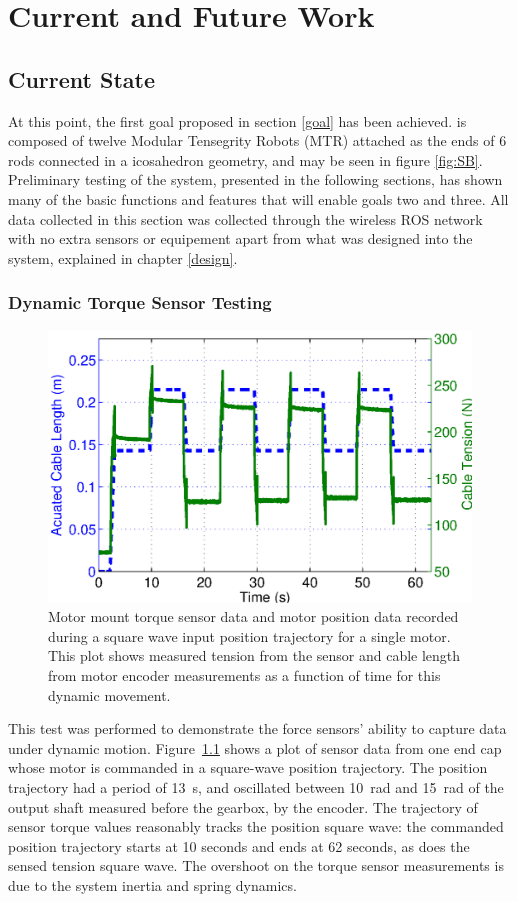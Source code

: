 \chapter{Current and Future Work}

\section{\SB{} Current State}
At this point, the first goal proposed in section \ref{goal} has been achieved.
\SB{} is composed of twelve Modular Tensegrity Robots (MTR) attached as the ends of 6 rods connected in a icosahedron geometry, and may be seen in figure \ref{fig:SB}.
Preliminary testing of the system, presented in the following sections, has shown many of the basic functions and features that will enable goals two and three.
All data collected in this section was collected through the wireless ROS network with no extra sensors or equipement apart from what was designed into the system, explained in chapter \ref{design}. 

\subsection{Dynamic Torque Sensor Testing}
\begin{figure}[thpb]
      \centering
      \includegraphics[width=0.8\columnwidth]{tex/img/ICRA2015_dynamic_sensor_test}
      \caption{Motor mount torque sensor data and motor position data recorded during a square wave input position trajectory for a single motor. This plot shows measured tension from the sensor and cable length from motor encoder measurements as a function of time for this dynamic movement.}
      \label{fig:sensor1data}
\end{figure}

This test was performed to demonstrate the force sensors' ability to capture data under dynamic motion.
Figure~\ref{fig:sensor1data} shows a plot of sensor data from one end cap whose motor is commanded in a square-wave position trajectory.
The position trajectory had a period of \SI{13}{\second}, and oscillated between \SI{10}{\radian} and \SI{15}{\radian} of the output shaft measured before the gearbox, by the encoder.
The trajectory of sensor torque values reasonably tracks the position square wave: the commanded position trajectory starts at 10 seconds and ends at 62 seconds, as does the sensed tension square wave.
The overshoot on the torque sensor measurements is due to the system inertia and spring dynamics.

